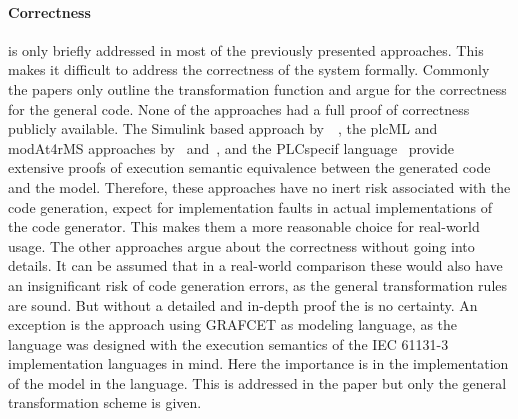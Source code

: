 \paragraph{Correctness} is only briefly addressed in most of the previously presented approaches.
This makes it difficult to address the correctness of the system formally.
Commonly the papers only outline the transformation function and argue for the correctness for the general code.
None of the approaches had a full proof of correctness publicly available.
The Simulink based approach by~\citeauthor{6489667}~\cite{6489667}, the plcML and modAt4rMS approaches by~\citeauthor{WITSCH2015} and~\citeauthor{Obermeier:2015aa}, and the PLCspecif language~\cite{7819191, darvas2015syntax, darvas2015requirements, darvas2015formal, 10.1007/978-3-319-33693-0_32} provide extensive proofs of execution semantic equivalence between the generated code and the model.
Therefore, these approaches have no inert risk associated with the code generation, expect for implementation faults in actual implementations of the code generator.
This makes them a more reasonable choice for real-world usage.
The other approaches argue about the correctness without going into details.
It can be assumed that in a real-world comparison these would also have an insignificant risk of code generation errors, as the general transformation rules are sound.
But without a detailed and in-depth proof the is no certainty.
An exception is the approach using GRAFCET as modeling language, as the language was designed with the execution semantics of the IEC 61131-3 implementation languages in mind.
Here the importance is in the implementation of the model in the language.
This is addressed in the paper but only the general transformation scheme is given.

